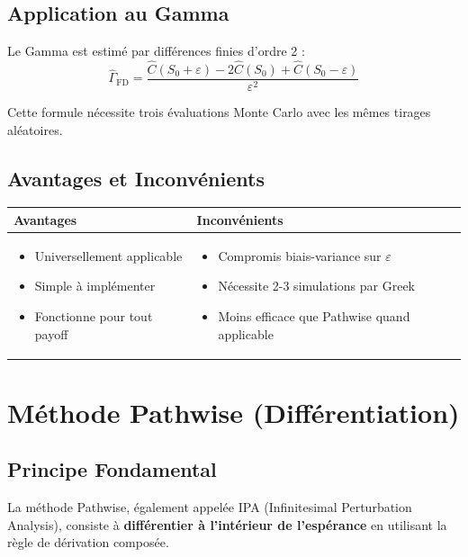 \documentclass[a4paper,11pt]{article}
\theoremstyle{definition}
\begin{document}
\subsection{Application au Gamma}

Le Gamma est estimé par différences finies d'ordre 2 :
$$\hat{\Gamma}_{\text{FD}} = \frac{\hat{C}(S_0 + \varepsilon) - 2\hat{C}(S_0) + \hat{C}(S_0 - \varepsilon)}{\varepsilon^2}$$

Cette formule nécessite trois évaluations Monte Carlo avec les mêmes tirages aléatoires.

\subsection{Avantages et Inconvénients}

\begin{table}[H]
\centering
\begin{tabular}{p{6cm}p{6cm}}
\toprule
\textbf{Avantages} & \textbf{Inconvénients} \\
\midrule
\begin{itemize}[leftmargin=*]
    \item Universellement applicable
    \item Simple à implémenter
    \item Fonctionne pour tout payoff
\end{itemize}
&
\begin{itemize}[leftmargin=*]
    \item Compromis biais-variance sur $\varepsilon$
    \item Nécessite 2-3 simulations par Greek
    \item Moins efficace que Pathwise quand applicable
\end{itemize}
\\
\bottomrule
\end{tabular}
\end{table}

\section{Méthode Pathwise (Différentiation)}

\subsection{Principe Fondamental}

La méthode Pathwise, également appelée IPA (Infinitesimal Perturbation Analysis), consiste à \textbf{différentier à l'intérieur de l'espérance} en utilisant la règle de dérivation composée.
\end{document}
